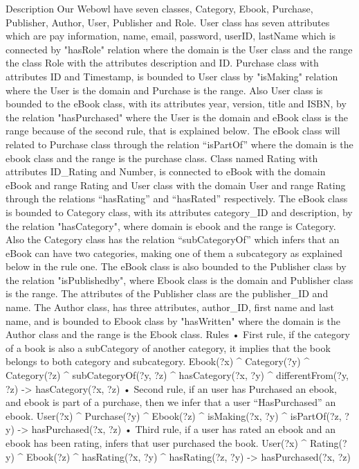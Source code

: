 Description
Our Webowl have seven classes, Category, Ebook, Purchase, Publisher, Author, User, Publisher and Role.
User class has seven attributes which are pay information, name, email, password, userID, lastName which is connected by "hasRole" relation where the domain is the User class and the range the class Role with the attributes description and ID. Purchase class with attributes ID and Timestamp, is bounded to User class by "isMaking" relation where the User is the domain and Purchase is the range. 
Also User class is bounded to the eBook class, with its attributes year, version, title and ISBN, by the relation "hasPurchased" where the User is the domain and eBook class is the range because of the second rule, that is explained below. The eBook class will related to Purchase class through the relation “isPartOf” where the domain is the ebook class and the range is the purchase class. 
Class named Rating with attributes ID_Rating and Number, is connected to eBook with the domain eBook and range Rating and User class with the domain User and range Rating through the relations “hasRating” and “hasRated” respectively.
The eBook class is bounded to Category class, with its attributes category_ID and description, by the relation "hasCategory", where domain is ebook and the range is Category. Also the Category class has the relation “subCategoryOf” which infers that an eBook can have two categories, making one of them a subcategory as explained below in the rule one.
The eBook class is also bounded to the Publisher class by the relation "isPublishedby", where Ebook class is the domain and Publisher class is the range. The attributes of the Publisher class are the publisher_ID and name. 
The Author class, has three attributes, author_ID, first name and last name, and is bounded to Ebook class by "hasWritten" where the domain is the Author class and the range is the Ebook class. 
Rules
•	First rule, if the category of a book is also a subCategory of another category, it implies that the book belongs to both category and subcategory.
	Ebook(?x) ^ Category(?y) ^ Category(?z) ^ subCategoryOf(?y, ?z) ^ hasCategory(?x, ?y) ^ differentFrom(?y, ?z) -> hasCategory(?x, ?z)
•	Second rule, if an user has Purchased an ebook, and ebook is part of a purchase, then we infer that a user “HasPurchased” an ebook. 
	User(?x) ^ Purchase(?y) ^ Ebook(?z) ^ isMaking(?x, ?y) ^ isPartOf(?z, ?y) -> hasPurchased(?x, ?z)
•	Third rule, if a user has rated an ebook and an ebook has been rating, infers that user purchased the book.
	User(?x) ^ Rating(?y) ^ Ebook(?z) ^ hasRating(?x, ?y) ^ hasRating(?z, ?y) -> hasPurchased(?x, ?z)
